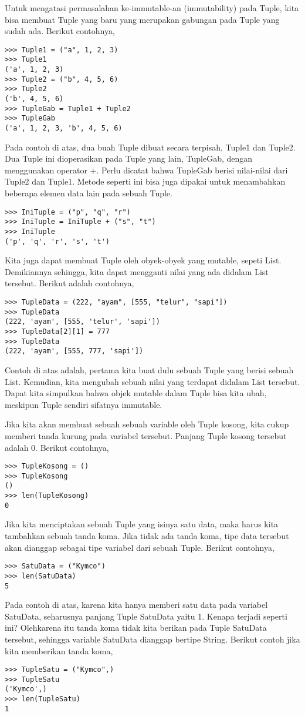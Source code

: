 Untuk mengatasi permasalahan ke-immutable-an (immutability) pada Tuple, kita bisa membuat Tuple yang baru yang merupakan gabungan pada Tuple yang sudah ada. Berikut contohnya,
\begin{verbatim}
>>> Tuple1 = ("a", 1, 2, 3)
>>> Tuple1
('a', 1, 2, 3)
>>> Tuple2 = ("b", 4, 5, 6)
>>> Tuple2
('b', 4, 5, 6)
>>> TupleGab = Tuple1 + Tuple2
>>> TupleGab
('a', 1, 2, 3, 'b', 4, 5, 6)
\end{verbatim}

Pada contoh di atas, dua buah Tuple dibuat secara terpisah, Tuple1 dan Tuple2. Dua Tuple ini dioperasikan pada Tuple yang lain, TupleGab, dengan menggunakan operator +. Perlu dicatat bahwa TupleGab berisi nilai-nilai dari Tuple2 dan Tuple1. Metode seperti ini bisa juga dipakai untuk menambahkan beberapa elemen data lain pada sebuah Tuple.
\begin{verbatim}
>>> IniTuple = ("p", "q", "r")
>>> IniTuple = IniTuple + ("s", "t")
>>> IniTuple
('p', 'q', 'r', 's', 't')
\end{verbatim}

Kita juga dapat membuat Tuple oleh obyek-obyek yang mutable, sepeti List. Demikiannya sehingga, kita dapat mengganti nilai yang ada didalam List tersebut. Berikut adalah contohnya,
\begin{verbatim}
>>> TupleData = (222, "ayam", [555, "telur", "sapi"])
>>> TupleData
(222, 'ayam', [555, 'telur', 'sapi'])
>>> TupleData[2][1] = 777
>>> TupleData
(222, 'ayam', [555, 777, 'sapi'])
\end{verbatim}
Contoh di atas adalah, pertama kita buat dulu sebuah Tuple yang berisi sebuah List. Kemudian, kita mengubah sebuah nilai yang terdapat didalam List tersebut. Dapat kita simpulkan bahwa objek mutable dalam Tuple bisa kita ubah, meskipun Tuple sendiri sifatnya immutable.

Jika kita akan membuat sebuah sebuah variable oleh Tuple kosong, kita cukup memberi tanda kurung pada variabel tersebut. Panjang Tuple kosong tersebut adalah 0. Berikut contohnya,
\begin{verbatim}
>>> TupleKosong = ()
>>> TupleKosong
()
>>> len(TupleKosong)
0
\end{verbatim}
Jika kita menciptakan sebuah Tuple yang isinya satu data, maka harus kita tambahkan sebuah tanda koma. Jika tidak ada tanda koma, tipe data tersebut akan dianggap sebagai tipe variabel dari sebuah Tuple. Berikut contohnya,
\begin{verbatim}
>>> SatuData = ("Kymco")
>>> len(SatuData)
5
\end{verbatim}
Pada contoh di atas, karena kita hanya memberi satu data pada variabel SatuData, seharusnya panjang Tuple SatuData yaitu 1. Kenapa terjadi seperti ini? Olehkarena itu tanda koma tidak kita berikan pada Tuple SatuData tersebut, sehingga variable SatuData dianggap bertipe String. Berikut contoh jika kita memberikan tanda koma,
\begin{verbatim}
>>> TupleSatu = ("Kymco",)
>>> TupleSatu
('Kymco',)
>>> len(TupleSatu)
1
\end{verbatim}

